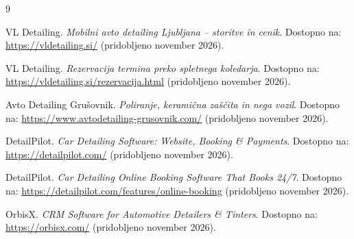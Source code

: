 \documentclass[11pt,a4paper]{article}
\begin{document}
\begin{thebibliography}{9}

VL Detailing. \emph{Mobilni avto detailing Ljubljana -- storitve in cenik}. Dostopno na: \url{https://vldetailing.si/} (pridobljeno november 2026).

VL Detailing. \emph{Rezervacija termina preko spletnega koledarja}. Dostopno na: \url{https://vldetailing.si/rezervacija.html} (pridobljeno november 2026).

Avto Detailing Grušovnik. \emph{Poliranje, keramična zaščita in nega vozil}. Dostopno na: \url{https://www.avtodetailing-grusovnik.com/} (pridobljeno november 2026).

DetailPilot. \emph{Car Detailing Software: Website, Booking \& Payments}. Dostopno na: \url{https://detailpilot.com/} (pridobljeno november 2026).

DetailPilot. \emph{Car Detailing Online Booking Software That Books 24/7}. Dostopno na: \url{https://detailpilot.com/features/online-booking} (pridobljeno november 2026).

OrbisX. \emph{CRM Software for Automotive Detailers \& Tinters}. Dostopno na: \url{https://orbisx.com/} (pridobljeno november 2026).

\end{thebibliography}
\end{document}
